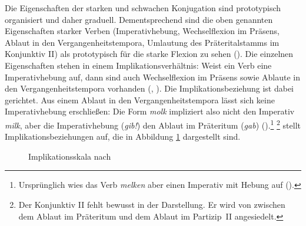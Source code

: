 Die Eigenschaften der starken und schwachen Konjugation sind prototypisch organisiert und daher graduell. Dementsprechend sind die oben genannten Eigenschaften starker Verben (Imperativhebung, Wechselflexion im Präsens, Ablaut in den Vergangenheitstempora, Umlautung des Präteritalstamms im Konjunktiv II) als prototypisch für die starke Flexion zu sehen (\cite[130--131]{Nowak.2016}). Die einzelnen Eigenschaften stehen in einem Implikationsverhältnis: Weist ein Verb eine Imperativhebung auf, dann sind auch Wechselflexion im Präsens sowie Ablaute in den Vergangenheitstempora vorhanden (\cite[54--57]{Bittner.1985}, \cite[26]{Dammel.2011b}). Die Implikationsbeziehung ist dabei gerichtet. Aus einem Ablaut in den Vergangenheitstempora lässt sich keine Imperativhebung erschließen: Die Form \textit{molk} impliziert also nicht den Imperativ \textit{milk}, aber die Imperativhebung (\textit{gib!}) den Ablaut im Präteritum (\textit{gab}) (\cite[26]{Dammel.2011b}).\footnote{Ursprünglich wies das Verb \textit{melken} aber einen Imperativ mit Hebung auf (\cite[156]{Nowak.2018}).} \textcite[80]{Bittner.1996}\footnote{Der Konjunktiv II fehlt bewusst in der Darstellung. Er wird von \textcite[80]{Bittner.1996} zwischen dem Ablaut im Präteritum und dem Ablaut im Partizip~II angesiedelt.} stellt Implikationsbeziehungen auf, die in Abbildung \ref{bittner} dargestellt sind. 


\begin{figure}
\caption{Implikationsskala nach \textcite[80]{Bittner.1996}}
\label{bittner}
\end{figure}

